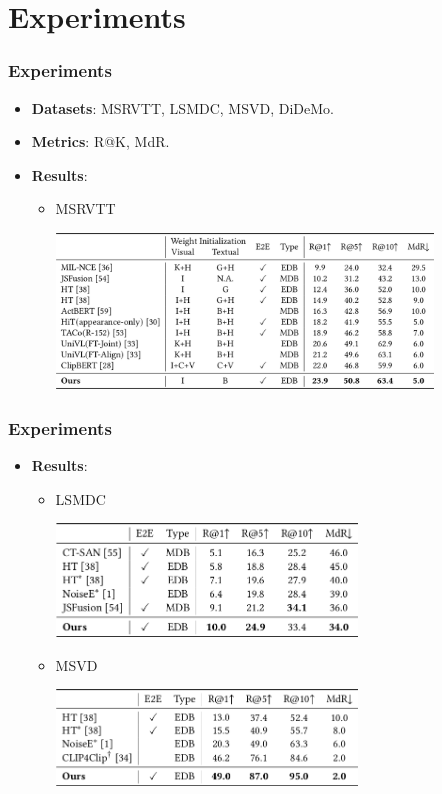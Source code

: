 \documentclass[notes, 10pt, aspectratio=169]{beamer}
\begin{document}
\section{Experiments}
\begin{frame}
    \frametitle{Experiments} 
    \begin{itemize}
        \item \textbf{Datasets}: MSRVTT, LSMDC, MSVD, DiDeMo.
        \item \textbf{Metrics}: R@K, MdR.
        \item \textbf{Results}:
            \begin{itemize}
                \item MSRVTT
                    \vspace{0.1cm}
                    \begin{center}
                        \includegraphics[width=10cm]{msrvtt.png}
                    \end{center}
            \end{itemize}
    \end{itemize}
\end{frame}

\begin{frame}
    \frametitle{Experiments}
    \begin{itemize}
        \item \textbf{Results}:
    \begin{itemize}
        \item LSMDC
            \begin{center}
                \includegraphics[width=8cm]{lsmdc.png}
            \end{center}
        \item MSVD
            \begin{center}
                \includegraphics[width=8cm]{msvd.png}
            \end{center}
    \end{itemize}
    \end{itemize}
\end{frame}
\end{document}
